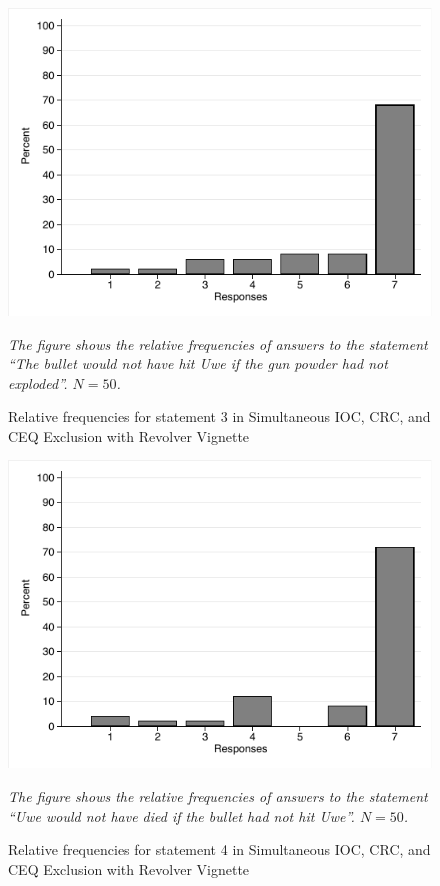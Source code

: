 \documentclass[egregdoesnotlikesansseriftitles,12pt]{scrartcl}
\begin{document}
\begin{figure}[H]
   \centering
   \includegraphics[scale=0.8]{figures/rev_com_hist_3.pdf}
   \begin{minipage}{0.9\linewidth}
   \footnotesize
   \emph{The figure shows the relative frequencies of answers to the statement ``The bullet would not have hit Uwe if the gun powder had not exploded''. $N=50$.}
   \end{minipage}
   \caption{Relative frequencies for statement 3 in Simultaneous IOC, CRC, and CEQ Exclusion with Revolver Vignette}
   \label{fig:rev_com_hist_3}
\end{figure}

\begin{figure}[H]
   \centering
   \includegraphics[scale=0.8]{figures/rev_com_hist_4.pdf}
   \begin{minipage}{0.9\linewidth}
   \footnotesize
   \emph{The figure shows the relative frequencies of answers to the statement ``Uwe would not have died if the bullet had not hit Uwe''. $N=50$.}
   \end{minipage}
   \caption{Relative frequencies for statement 4 in Simultaneous IOC, CRC, and CEQ Exclusion with Revolver Vignette}
   \label{fig:rev_com_hist_4}
\end{figure}
\end{document}
